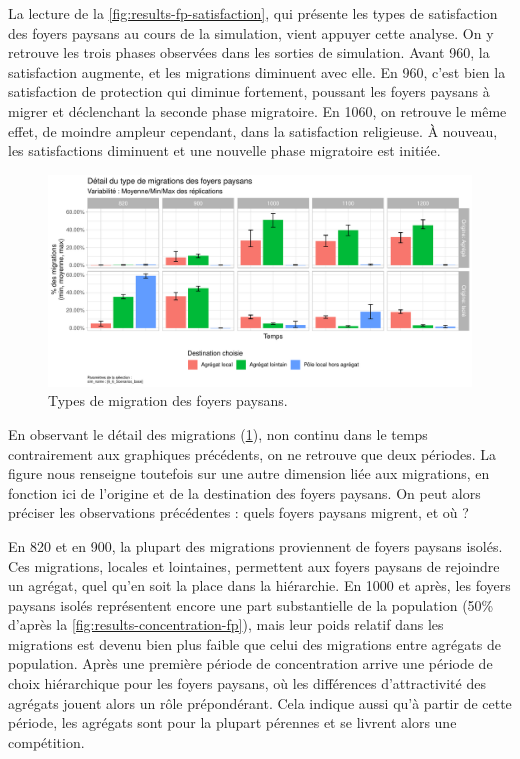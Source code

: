 La lecture de la \cref{fig:results-fp-satisfaction}, qui présente les types de satisfaction des foyers paysans au cours de la simulation, vient appuyer cette analyse.
On y retrouve les trois phases observées dans les sorties de simulation.
Avant 960, la satisfaction augmente, et les migrations diminuent avec elle.
En 960, c'est bien la satisfaction de protection qui diminue fortement, poussant les foyers paysans à migrer et déclenchant la seconde phase migratoire.
En 1060, on retrouve le même effet, de moindre ampleur cependant, dans la satisfaction religieuse. À nouveau, les satisfactions diminuent et une nouvelle phase migratoire est initiée.

\begin{figure}[H]
	\centering
	\includegraphics[width=\linewidth]{img/results_6_6/FP_DeplacementsDetail_Haut.pdf}
	\caption{Types de migration des foyers paysans.}
	\label{fig:results-fp-migrations-detail}
\end{figure}

En observant le détail des migrations (\cref{fig:results-fp-migrations-detail}), non continu dans le temps contrairement aux graphiques précédents, on ne retrouve que deux périodes.
La figure nous renseigne toutefois sur une autre dimension liée aux migrations, en fonction ici de l'origine et de la destination des foyers paysans.
On peut alors préciser les observations précédentes : quels foyers paysans migrent, et où ?

En 820 et en 900, la plupart des migrations proviennent de foyers paysans isolés.
Ces migrations, locales et lointaines, permettent aux foyers paysans de rejoindre un agrégat, quel qu'en soit la place dans la hiérarchie.
En 1000 et après, les foyers paysans isolés représentent encore une part substantielle de la population (50\% d'après la \cref{fig:results-concentration-fp}), mais leur poids relatif dans les migrations est devenu bien plus faible que celui des migrations entre agrégats de population.
Après une première période de concentration arrive une période de choix hiérarchique pour les foyers paysans, où les différences d'attractivité des agrégats jouent alors un rôle prépondérant.
Cela indique aussi qu'à partir de cette période, les agrégats sont pour la plupart pérennes et se livrent alors une compétition.


